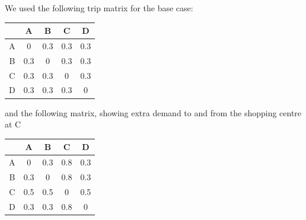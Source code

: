 We used the following trip matrix for the base case:
	\begin{center}
	\begin{tabular}{| c | c | c | c | c |}
		\hline
		\textbf{ }	&	A & B & C & D \\ \hline
		A				&	0 & 0.3 & 0.3 & 0.3				\\ \hline
		B					&	0.3 & 0 & 0.3 & 0.3				\\ \hline
		C	&	0.3 & 0.3 & 0 & 0.3			\\ \hline
		D				&	0.3 & 0.3 & 0.3 & 0				\\ \hline

		
	\end{tabular}
	\end{center} and the following matrix, showing extra demand to and from the shopping centre at C
    \begin{center}
	\begin{tabular}{| c | c | c | c | c |}
		\hline
		\textbf{ }	&	A & B & C & D \\ \hline
		A				&	0 & 0.3 & 0.8 & 0.3				\\ \hline
		B					&	0.3 & 0 & 0.8 & 0.3				\\ \hline
		C	&	0.5 & 0.5 & 0 & 0.5			\\ \hline
		D				&	0.3 & 0.3 & 0.8 & 0				\\ \hline

		
	\end{tabular}
	\end{center}
    
